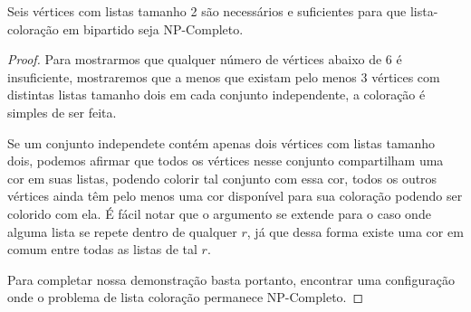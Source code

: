 \begin{teorema}
 Seis vértices com listas tamanho 2 são necessários e suficientes para que lista-coloração em bipartido seja NP-Completo.
\end{teorema}
\begin{proof}
 Para mostrarmos que qualquer número de vértices abaixo de 6 é insuficiente, mostraremos que a menos que existam pelo menos 3 vértices com distintas listas tamanho dois em cada conjunto independente, a coloração é simples de ser feita. 
 
 Se um conjunto independete contém apenas dois vértices com listas tamanho dois, podemos afirmar que todos os vértices nesse conjunto compartilham uma cor em suas listas, podendo colorir tal conjunto com essa cor, todos os outros vértices ainda têm pelo menos uma cor disponível para sua coloração podendo ser colorido com ela. É fácil notar que o argumento se extende para o caso onde alguma lista se repete dentro de qualquer $r$, já que dessa forma existe uma cor em comum entre todas as listas de tal $r$.
 
 Para completar nossa demonstração basta portanto, encontrar uma configuração onde o problema de lista coloração permanece NP-Completo.
 

\end{proof}
